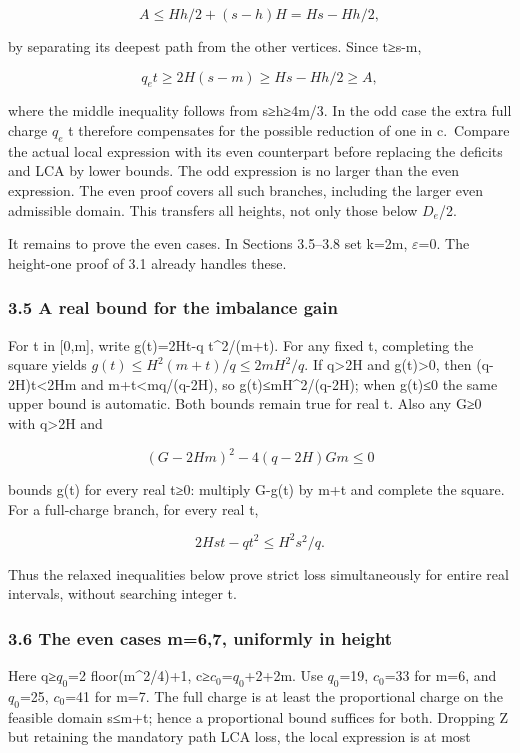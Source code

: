 \documentclass[
  10pt,
  a4paper,
]{article}
\begin{document}
\[A\le Hh/2+(s-h)H=Hs-Hh/2,\]

by separating its deepest path from the other vertices. Since t≥s-m,

\[q_e t\ge2H(s-m)\ge Hs-Hh/2\ge A,\]

where the middle inequality follows from s≥h≥4m/3. In the odd case the
extra full charge \(q_e\) t therefore compensates for the possible
reduction of one in c.~Compare the actual local expression with its even
counterpart before replacing the deficits and LCA by lower bounds. The
odd expression is no larger than the even expression. The even proof
covers all such branches, including the larger even admissible domain.
This transfers all heights, not only those below \(D_e\)/2.

It remains to prove the even cases. In Sections 3.5--3.8 set k=2m,
\(\varepsilon\)=0. The height-one proof of 3.1 already handles these.

\subsubsection{3.5 A real bound for the imbalance
gain}\label{a-real-bound-for-the-imbalance-gain}

For t in {[}0,m{]}, write g(t)=2Ht-q t\^{}2/(m+t). For any fixed t,
completing the square yields \(g(t)\le H^2(m+t)/q\le 2mH^2/q\). If
q\textgreater2H and g(t)\textgreater0, then (q-2H)t\textless2Hm and
m+t\textless mq/(q-2H), so g(t)≤mH\^{}2/(q-2H); when g(t)≤0 the same
upper bound is automatic. Both bounds remain true for real t. Also any
G≥0 with q\textgreater2H and

\[(G-2Hm)^2-4(q-2H)Gm\le0\]

bounds g(t) for every real t≥0: multiply G-g(t) by m+t and complete the
square. For a full-charge branch, for every real t,

\[2Hst-qt^2\le H^2s^2/q.\]

Thus the relaxed inequalities below prove strict loss simultaneously for
entire real intervals, without searching integer t.

\subsubsection{3.6 The even cases m=6,7, uniformly in
height}\label{the-even-cases-m67-uniformly-in-height}

Here q≥\(q_0\)=2 floor(m\^{}2/4)+1, c≥\(c_0\)=\(q_0\)+2+2m. Use
\(q_0\)=19, \(c_0\)=33 for m=6, and \(q_0\)=25, \(c_0\)=41 for m=7. The
full charge is at least the proportional charge on the feasible domain
s≤m+t; hence a proportional bound suffices for both. Dropping Z but
retaining the mandatory path LCA loss, the local expression is at most
\end{document}
